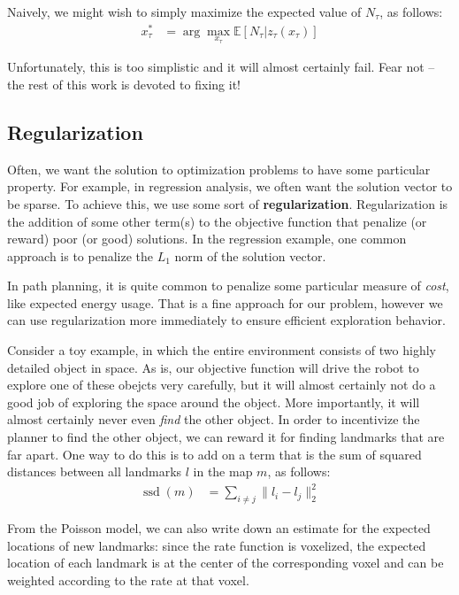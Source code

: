 \documentclass[12pt]{article}
\DeclareMathOperator{\ssd}{ssd}
\begin{document}
Naively, we might wish to simply maximize the expected value of $N_{\tau}$, as follows:
\begin{align}
  x_{\tau}^* &= \arg \max_{x_{\tau}} \mathbb{E}[N_{\tau} | z_{\tau}(x_{\tau})]
\end{align}

Unfortunately, this is too simplistic and it will almost certainly fail. Fear not -- the rest of this work is devoted to fixing it!

\subsection{Regularization}

Often, we want the solution to optimization problems to have some particular property. For example, in regression analysis, we often want the solution vector to be sparse. To achieve this, we use some sort of \textbf{regularization}. Regularization is the addition of some other term(s) to the objective function that penalize (or reward) poor (or good) solutions. In the regression example, one common approach is to penalize the $L_1$ norm of the solution vector.

In path planning, it is quite common to penalize some particular measure of \textit{cost}, like expected energy usage. That is a fine approach for our problem, however we can use regularization more immediately to ensure efficient exploration behavior.

Consider a toy example, in which the entire environment consists of two highly detailed object in space. As is, our objective function will drive the robot to explore one of these obejcts very carefully, but it will almost certainly not do a good job of exploring the space around the object. More importantly, it will almost certainly never even \textit{find} the other object. In order to incentivize the planner to find the other object, we can reward it for finding landmarks that are far apart. One way to do this is to add on a term that is the sum of squared distances between all landmarks $l$ in the map $m$, as follows:
\begin{align}
  \ssd(m) &= \sum_{i \ne j} \|l_i - l_j\|_2^2
\end{align}

From the Poisson model, we can also write down an estimate for the expected locations of new landmarks: since the rate function is voxelized, the expected location of each landmark is at the center of the corresponding voxel and can be weighted according to the rate at that voxel.
\end{document}
